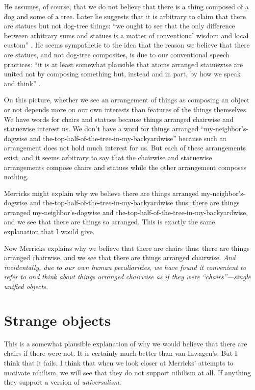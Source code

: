 \documentclass[11pt]{article}
\begin{document}
\begin{spacing}{1.25}
He assumes, of course, that we do not believe that there is a thing
composed of a dog and some of a tree.  Later he suggests that it is
arbitrary to claim that there are statues but not dog-tree things:
``we ought to see that the only difference between arbitrary sums and
statues is a matter of conventional wisdom and local custom''
\citeyearpar[75]{merricks2001a}.  He seems sympathetic to the idea
that the reason we believe that there are statues, and not dog-tree
composites, is due to our conventional speech practices: ``it is at
least somewhat plausible that atoms arranged statuewise are united not
by composing something but, instead and in part, by how we speak and
think'' \citeyearpar[121]{merricks2001a}.

On this picture, whether we see an arrangement of things as composing
an object or not depends more on our own interests than features of
the things themselves.  We have words for chairs and statues because
things arranged chairwise and statuewise interest us.  We don't have a
word for things arranged ``my-neighbor's-dogwise and
the-top-half-of-the-tree-in-my-backyardwise'' because such an
arrangement does not hold much interest for us.  But each of these
arrangements exist, and it seems arbitrary to say that the chairwise
and statuewise arrangements compose chairs and statues while the other
arrangement composes nothing.

Merricks might explain why we believe there are things arranged
my-neighbor's-dogwise and the-top-half-of-the-tree-in-my-backyardwise
thus: there are things arranged my-neighbor's-dogwise and
the-top-half-of-the-tree-in-my-backyardwise, and we see that there are
things so arranged.  This is exactly the same explanation that I would
give.

Now Merricks explains why we believe that there are chairs thus: there
are things arranged chairwise, and we see that there are things
arranged chairwise.  {\em And incidentally, due to our own human
  peculiarities, we have found it convenient to refer to and think
  about things arranged chairwise as if they were ``chairs''---single
  unified objects}.

\section{Strange objects}
\label{dogbush}
This is a somewhat plausible explanation of why we would believe that
there are chairs if there were not.  It is certainly much better than
van Inwagen's.  But I think that it fails.  I think that when we look
closer at Merricks' attempts to motivate nihilism, we will see that
they do not support nihilism at all.  If anything they support a
version of {\em universalism}.


\end{spacing}
\end{document}

